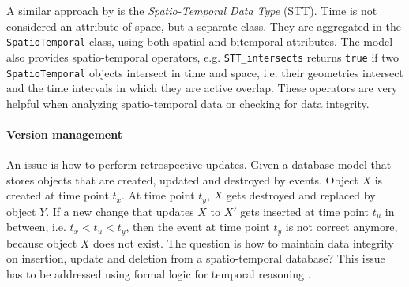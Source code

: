 A similar approach by \cite{raza12} is the \emph{Spatio-Temporal Data Type} (STT). Time is not considered an attribute of space, but a separate class. They are aggregated in the \texttt{SpatioTemporal} class, using both spatial and bitemporal attributes. The model also provides spatio-temporal operators, e.g. \texttt{STT\_intersects} returns \texttt{true} if two \texttt{SpatioTemporal} objects intersect in time and space, i.e. their geometries intersect and the time intervals in which they are active overlap. These operators are very helpful when analyzing spatio-temporal data or checking for data integrity.


\paragraph{Version management} %
\label{par:version_management}

An issue is how to perform retrospective updates. Given a database model that stores objects that are created, updated and destroyed by events. Object $X$ is created at time point $t_x$. At time point $t_y$, $X$ gets destroyed and replaced by object $Y$. If a new change that updates $X$ to $X'$ gets inserted at time point $t_u$ in between, i.e. $t_x < t_u < t_y$, then the event at time point $t_y$ is not correct anymore, because object $X$ does not exist. The question is how to maintain data integrity on insertion, update and deletion from a spatio-temporal database? This issue has to be addressed using formal logic for temporal reasoning
\cite[section 6]{peuquet99}.


